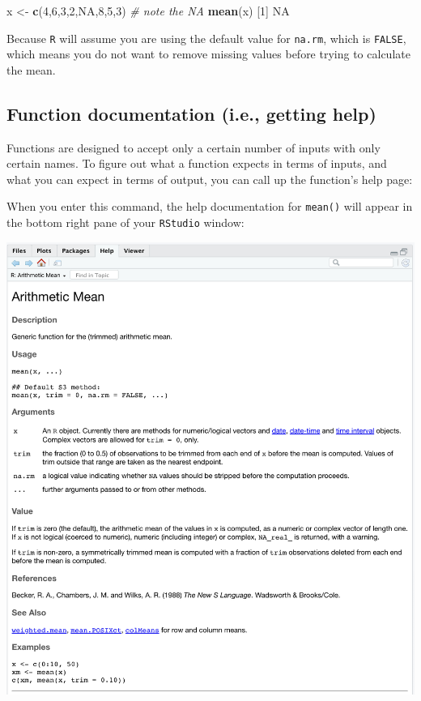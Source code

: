 \documentclass[
]{book}
\newenvironment{Shaded}{\begin{snugshade}}{\end{snugshade}}
\newcommand{\CommentTok}[1]{\textcolor[rgb]{0.56,0.35,0.01}{\textit{#1}}}
\newcommand{\DecValTok}[1]{\textcolor[rgb]{0.00,0.00,0.81}{#1}}
\newcommand{\KeywordTok}[1]{\textcolor[rgb]{0.13,0.29,0.53}{\textbf{#1}}}
\newcommand{\NormalTok}[1]{#1}
\newcommand{\OtherTok}[1]{\textcolor[rgb]{0.56,0.35,0.01}{#1}}
\newcommand{\StringTok}[1]{\textcolor[rgb]{0.31,0.60,0.02}{#1}}
\begin{document}
\begin{Shaded}
\begin{Highlighting}[]
\NormalTok{x <-}\StringTok{ }\KeywordTok{c}\NormalTok{(}\DecValTok{4}\NormalTok{,}\DecValTok{6}\NormalTok{,}\DecValTok{3}\NormalTok{,}\DecValTok{2}\NormalTok{,}\OtherTok{NA}\NormalTok{,}\DecValTok{8}\NormalTok{,}\DecValTok{5}\NormalTok{,}\DecValTok{3}\NormalTok{)  }\CommentTok{# note the NA}
\KeywordTok{mean}\NormalTok{(x)}
\NormalTok{[}\DecValTok{1}\NormalTok{] }\OtherTok{NA}
\end{Highlighting}
\end{Shaded}

Because \texttt{R} will assume you are using the default value for \texttt{na.rm}, which is \texttt{FALSE}, which means you do not want to remove missing values before trying to calculate the mean.

\hypertarget{function-documentation-i.e.-getting-help}{%
\subsection*{Function documentation (i.e., getting help)}\label{function-documentation-i.e.-getting-help}}

Functions are designed to accept only a certain number of inputs with only certain names. To figure out what a function expects in terms of inputs, and what you can expect in terms of output, you can call up the function's help page:

When you enter this command, the help documentation for \texttt{mean()} will appear in the bottom right pane of your \texttt{RStudio} window:

\includegraphics{img/functions_help.png}
\end{document}
